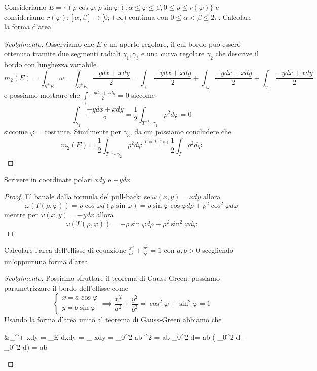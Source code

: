 \begin{example}
	Consideriamo $E = \{(\rho \cos{\varphi}, \rho \sin{\varphi}) : \alpha \leq \varphi \leq \beta, 0 \leq \rho \leq r(\varphi) \}$ e consideriamo $r(\varphi) : [\alpha, \beta] \to [0; +\infty)$ continua con $0 \leq \alpha < \beta \leq 2 \pi$. Calcolare la forma d'area
\end{example}
\begin{proof}[Svolgimento]
	Osserviamo che $E$ è un aperto regolare, il cui bordo può essere ottenuto tramite due segmenti radiali $\gamma_1, \gamma_3$ e una curva regolare $\gamma_2$ che descrive il bordo con lunghezza variabile.
	$$
	m_2(E) = \int_{\partial^{+} E} \omega = \int_{\partial^{+} E} \frac{-ydx + xdy}{2} = \int_{\gamma_1} \frac{-ydx + xdy}{2} + \int_{\gamma_2} \frac{-ydx + xdy}{2} + \int_{\gamma_3} \frac{-ydx + xdy}{2}
	$$
	e possiamo mostrare che $
	\int\limits_{\gamma_1} \frac{-ydx + xdy}{2} = 0
	$
	siccome
	$$
	\int_{\gamma_1} \frac{-ydx + xdy}{2} = \frac{1}{2} \int_{T^{-1} \circ \gamma_1} \rho^2 d\varphi = 0 
	$$
	siccome $\varphi=\text{costante}$. Similmente per $\gamma_3$, da cui possiamo concludere che
	$$
	m_2(E) = \frac{1}{2} \int_{T^{-1} \circ \gamma_2} \rho^2 d\varphi \stackrel{\Gamma = T^{-1} \circ \gamma}{=} \frac{1}{2} \int_\Gamma \rho^2 d\varphi  
	$$
\end{proof}
\begin{exercise}
	Scrivere in coordinate polari $xdy$ e $-ydx$
\end{exercise}
\begin{proof}
	E' banale dalla formula del pull-back: se $\omega(x, y) = xdy$ allora
	$$
	\omega(T(\rho, \varphi)) = \rho \cos{\varphi} d(\rho \sin{\varphi}) = \rho \sin{\varphi} \cos{\varphi} d\rho + \rho^2 \cos^2{\varphi} d\varphi  
	$$
	mentre per $\omega(x, y) = -ydx$ allora
	$$
	\omega(T(\rho, \varphi)) = -\rho \sin{\varphi} d\rho + \rho^2 \sin^2{\varphi} d\varphi  
	$$
\end{proof}
\begin{exercise}
	Calcolare l'area dell'ellisse di equazione $\frac{x^2}{a^2} + \frac{y^2}{b^2} = 1$ con $a, b > 0$ scegliendo un'oppurtuna forma d'area
\end{exercise}
\begin{proof}[Svolgimento]
	Possiamo sfruttare il teorema di Gauss-Green: possiamo parametrizzare il bordo dell'ellisse come
	$$
	\begin{cases}
		x = a \cos{\varphi} \\
		y = b \sin{\varphi}
	\end{cases} \implies \frac{x^2}{a^2} + \frac{y^2}{b^2} = \cos^2{\varphi} + \sin^2{\varphi} = 1
	$$
	Usando la forma d'area unito al teorema di Gauss-Green abbiamo che
	\begin{flalign*}
	&\int_{\partial^{+} \Omega} xdy = \int_E dxdy = \int_{\gamma} xdy = \int_0^{2\pi} ab \cos^2{\varphi} = ab \int_0^{2\pi} d\varphi = ab \left( \int_0^{2\pi}  d\varphi +  \int_0^{2\pi} \cos{2\varphi} d\varphi \right) = \pi ab
	\end{flalign*}
\end{proof}
